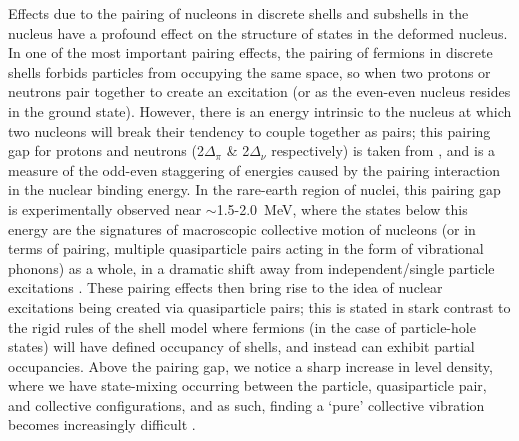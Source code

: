 Effects due to the pairing of nucleons in discrete shells and subshells in the nucleus have a profound effect on the structure of states in the deformed nucleus. In one of the most important pairing effects, the pairing of fermions in discrete shells forbids particles from occupying the same space, so when two protons or neutrons pair together to create an excitation (or as the even-even nucleus resides in the ground state). However, there is an energy intrinsic to the nucleus at which two nucleons will break their tendency to couple together as pairs; this pairing gap for protons and neutrons (2$\Delta_{\pi}$ \& 2$\Delta_{\nu}$ respectively) is taken from \cite{MANG_pairing1965353}, and is a measure of the odd-even staggering of energies caused by the pairing interaction in the nuclear binding energy. In the rare-earth region of nuclei, this pairing gap is experimentally observed near $\sim$1.5-2.0~MeV, where the states below this energy are the signatures of macroscopic collective motion of nucleons (or in terms of pairing, multiple quasiparticle pairs acting in the form of vibrational phonons) as a whole, in a dramatic shift away from independent/single particle excitations \cite{Bohr_pairing1958}. These pairing effects then bring rise to the idea of nuclear excitations being created via quasiparticle pairs; this is stated in stark contrast to the rigid rules of the shell model where fermions (in the case of particle-hole states) will have defined occupancy of shells, and instead can exhibit partial occupancies. Above the pairing gap, we notice a sharp increase in level density, where we have state-mixing occurring between the particle, quasiparticle pair, and collective configurations, and as such, finding a `pure' collective vibration becomes increasingly difficult \cite{Casten_text,Heyde_text}.



